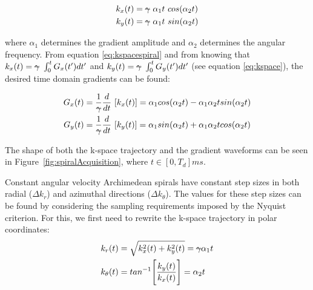 \begin{equation}\label{eq:kspacespiral}
    \begin{split}
        k_x(t) &= \text{\sout{$\gamma$}} \, \, \alpha_1 t \, \, cos (\alpha_2 t) \\
        k_y(t) &= \text{\sout{$\gamma$}}  \, \, \alpha_1 t  \, \, sin (\alpha_2 t) 
    \end{split}
\end{equation}

where $\alpha_1$ determines the gradient amplitude and $\alpha_2$ determines the angular frequency.
From equation \ref{eq:kspacespiral} and from knowing that $k_x(t) = \text{\sout{$\gamma$}} \, \, \int_0^t G_x(t') dt'$ and $k_y(t) = \text{\sout{$\gamma$}} \, \, \int_0^t G_y(t') dt'$ (see equation \ref{eq:kspace}), the desired time domain gradients can be found:

\begin{equation}
    \begin{split}
        G_x(t) &= \frac{1}{\text{\sout{$\gamma$}}} \frac{d}{dt} \,\, [k_x(t)] = \alpha_1 cos (\alpha_2 t) - \alpha_1 \alpha_2 t sin (\alpha_2 t) \\
        G_y(t) &= \frac{1}{\text{\sout{$\gamma$}}} \frac{d}{dt} \,\, [k_y(t)] = \alpha_1 sin (\alpha_2 t) + \alpha_1 \alpha_2 t cos (\alpha_2 t) 
    \end{split}
\end{equation}

The shape of both the k-space trajectory and the gradient waveforms can be seen in Figure~\ref{fig:spiralAcquisition}, where $t \in [0, T_d]ms$.

\hfill

Constant angular velocity Archimedean spirals have constant step sizes in both radial ($\Delta k_r$) and azimuthal directions ($\Delta k_{\theta}$).
The values for these step sizes can be found by considering the sampling requirements imposed by the Nyquist criterion.
For this, we first need to rewrite the k-space trajectory in polar coordinates:
\begin{equation}
    \begin{split}
        k_r(t) &= \sqrt{k_x^2(t) + k_y^2(t)} = \text{\sout{$\gamma$}} \alpha_1 t \\
        k_{\theta}(t) &= tan^{-1} \Bigg[ \frac{k_y(t)}{k_x(t)} \Bigg] = \alpha_2 t
    \end{split}
\end{equation}

